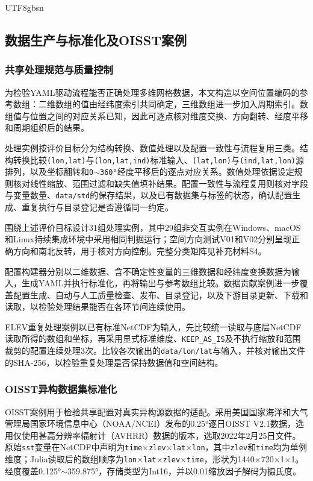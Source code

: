 \documentclass[numdoi]{chinese}
\begin{document}
\begin{CJK}{UTF8}{gbsn}
\subsection{数据生产与标准化及OISST案例}
\subsubsection{共享处理规范与质量控制}
为检验YAML驱动流程能否正确处理多维网格数据，本文构造以空间位置编码的参考数组：二维数组的值由经纬度索引共同确定，三维数组进一步加入周期索引。数组值与位置之间的对应关系已知，因此可逐点核对维度交换、方向翻转、经度平移和周期组织后的结果。

处理实例按评价目标分为结构转换、数值处理以及配置一致性与流程复用三类。结构转换比较\nolinkurl{(lon,lat)}与\nolinkurl{(lon,lat,ind)}标准输入、\nolinkurl{(lat,lon)}与\nolinkurl{(ind,lat,lon)}源排列，以及坐标翻转和\texttt{0\ensuremath{\sim}360°}经度平移后的逐点对应关系。数值处理依据设定规则核对线性缩放、范围过滤和缺失值填补结果。配置一致性与流程复用则核对字段与变量数量、\nolinkurl{data/std}的保存结果，以及已有数据集与标签的状态，确认配置生成、重复执行与目录登记是否遵循同一约定。

围绕上述评价目标设计31组处理实例，其中29组非交互实例在Windows、macOS和Linux持续集成环境中采用相同判据运行；空间方向测试V01和V02分别呈现正确方向和南北反转，用于核对方向控制。完整分类矩阵见补充材料S4。

配置构建器分别以二维数据、含不确定性变量的三维数据和经纬度变换数据为输入，生成YAML并执行标准化，再将输出与参考数组比较。数据贡献案例进一步覆盖配置生成、自动与人工质量检查、发布、目录登记，以及下游目录更新、下载和读取，以检验处理结果能否在各环节间连续使用。

ELEV重复处理案例以已有标准NetCDF为输入，先比较统一读取与底层NetCDF读取所得的数组和坐标，再采用显式标准维度、\nolinkurl{KEEP_AS_IS}及不执行缩放和范围裁剪的配置连续处理3次。比较各次输出的\nolinkurl{data/lon/lat}与输入，并核对输出文件的SHA-256，以检验重复处理是否保持数据值和空间结构。

\subsubsection{OISST异构数据集标准化}
OISST案例用于检验共享配置对真实异构源数据的适配。采用美国国家海洋和大气管理局国家环境信息中心（NOAA/NCEI）发布的0.25°逐日OISST V2.1数据，选用仅使用甚高分辨率辐射计（AVHRR）数据的版本\cite{ref10}，选取2022年2月25日文件。原始\nolinkurl{sst}变量在NetCDF中声明为\texttt{time\ensuremath{\times}zlev\ensuremath{\times}lat\ensuremath{\times}lon}，其中\nolinkurl{zlev}和\nolinkurl{time}均为单例维度；Julia读取后的数组顺序为\texttt{lon\ensuremath{\times}lat\ensuremath{\times}zlev\ensuremath{\times}time}，形状为1440\ensuremath{\times}720\ensuremath{\times}1\ensuremath{\times}1。经度覆盖0.125°\ensuremath{\sim}359.875°，存储类型为Int16，并以0.01缩放因子解码为摄氏度。


\end{CJK}
\end{document}
